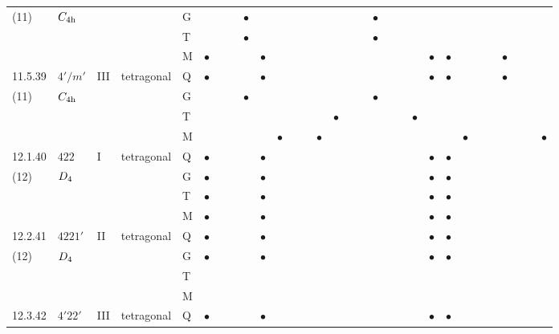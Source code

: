 \documentclass[fleqn,9pt,landscape]{jsarticle}
\begin{document}
\begin{longtable}{lllll|l|lll|ll|lll|l|lll|lll|l|ll|lll|lll}
(11) & $C_{\rm 4h}$ &  &  & G &  &  &  & $\bullet$ &  &  &  &  &  &  &  &  & $\bullet$ &  &  &  &  &  &  &  &  &  &  &  &  \\
 &  &  &  & T &  &  &  & $\bullet$ &  &  &  &  &  &  &  &  & $\bullet$ &  &  &  &  &  &  &  &  &  &  &  &  \\
 &  &  &  & M & $\bullet$ &  &  &  & $\bullet$ &  &  &  &  &  &  &  &  &  &  &  & $\bullet$ & $\bullet$ &  &  &  & $\bullet$ &  &  &  \\ \hline
11.5.39 & \texttt{$4'/m'$} & III & tetragonal & Q & $\bullet$ &  &  &  & $\bullet$ &  &  &  &  &  &  &  &  &  &  &  & $\bullet$ & $\bullet$ &  &  &  & $\bullet$ &  &  &  \\
(11) & $C_{\rm 4h}$ &  &  & G &  &  &  & $\bullet$ &  &  &  &  &  &  &  &  & $\bullet$ &  &  &  &  &  &  &  &  &  &  &  &  \\
 &  &  &  & T &  &  &  &  &  &  &  &  &  & $\bullet$ &  &  &  &  &  & $\bullet$ &  &  &  &  &  &  &  &  &  \\
 &  &  &  & M &  &  &  &  &  & $\bullet$ &  &  & $\bullet$ &  &  &  &  &  &  &  &  &  & $\bullet$ &  &  &  &  &  & $\bullet$ \\ \hline
12.1.40 & \texttt{$422$} & I & tetragonal & Q & $\bullet$ &  &  &  & $\bullet$ &  &  &  &  &  &  &  &  &  &  &  & $\bullet$ & $\bullet$ &  &  &  &  &  &  &  \\
(12) & $D_{\rm 4}$ &  &  & G & $\bullet$ &  &  &  & $\bullet$ &  &  &  &  &  &  &  &  &  &  &  & $\bullet$ & $\bullet$ &  &  &  &  &  &  &  \\
 &  &  &  & T & $\bullet$ &  &  &  & $\bullet$ &  &  &  &  &  &  &  &  &  &  &  & $\bullet$ & $\bullet$ &  &  &  &  &  &  &  \\
 &  &  &  & M & $\bullet$ &  &  &  & $\bullet$ &  &  &  &  &  &  &  &  &  &  &  & $\bullet$ & $\bullet$ &  &  &  &  &  &  &  \\ \hline
12.2.41 & \texttt{$4221'$} & II & tetragonal & Q & $\bullet$ &  &  &  & $\bullet$ &  &  &  &  &  &  &  &  &  &  &  & $\bullet$ & $\bullet$ &  &  &  &  &  &  &  \\
(12) & $D_{\rm 4}$ &  &  & G & $\bullet$ &  &  &  & $\bullet$ &  &  &  &  &  &  &  &  &  &  &  & $\bullet$ & $\bullet$ &  &  &  &  &  &  &  \\
 &  &  &  & T &  &  &  &  &  &  &  &  &  &  &  &  &  &  &  &  &  &  &  &  &  &  &  &  &  \\
 &  &  &  & M &  &  &  &  &  &  &  &  &  &  &  &  &  &  &  &  &  &  &  &  &  &  &  &  &  \\ \hline
12.3.42 & \texttt{$4'22'$} & III & tetragonal & Q & $\bullet$ &  &  &  & $\bullet$ &  &  &  &  &  &  &  &  &  &  &  & $\bullet$ & $\bullet$ &  &  &  &  &  &  &  \\

\end{longtable}
\end{document}
